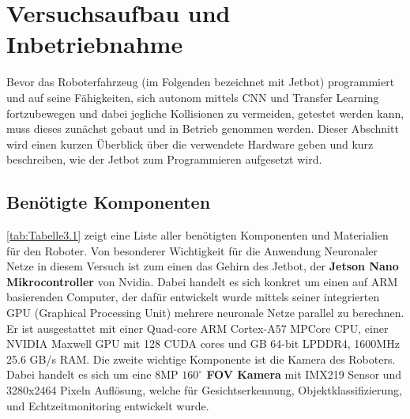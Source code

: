 \section{Versuchsaufbau und Inbetriebnahme} \label{sec:versuchsaufbau}

Bevor das Roboterfahrzeug (im Folgenden bezeichnet mit \glqq Jetbot\grqq{}) programmiert und auf seine Fähigkeiten, sich autonom mittels CNN und Transfer Learning fortzubewegen und dabei jegliche Kollisionen zu vermeiden, getestet werden kann, muss dieses zunächst gebaut und in Betrieb genommen werden. Dieser Abschnitt wird einen kurzen Überblick über die verwendete Hardware geben und kurz beschreiben, wie der Jetbot zum Programmieren aufgesetzt wird. 

\subsection{Benötigte Komponenten}

\autoref{tab:Tabelle3.1} zeigt eine Liste aller benötigten Komponenten und Materialien für den Roboter. Von besonderer Wichtigkeit für die Anwendung Neuronaler Netze in diesem Versuch ist zum einen das Gehirn des Jetbot, der \textbf{Jetson Nano Mikrocontroller} von Nvidia. Dabei handelt es sich konkret um einen auf ARM basierenden Computer, der dafür entwickelt wurde mittels seiner integrierten GPU (Graphical Processing Unit) mehrere neuronale Netze parallel zu berechnen. Er ist ausgestattet mit einer Quad-core ARM Cortex-A57 MPCore CPU, einer NVIDIA Maxwell GPU mit 128 CUDA cores und GB 64-bit LPDDR4, 1600MHz 25.6 GB/s RAM. Die zweite wichtige Komponente ist die Kamera des Roboters. Dabei handelt es sich um eine 8MP \textbf{$160^\circ$ FOV Kamera} mit IMX219 Sensor und 3280x2464 Pixeln Auflösung, welche für Gesichtserkennung, Objektklassifizierung, und Echtzeitmonitoring entwickelt wurde.

